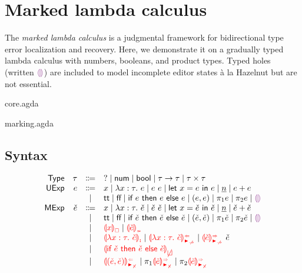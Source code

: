 \documentclass[formalism.tex]{subfiles}
\begin{document}




\section{Marked lambda calculus}
\label{sec:marked}

The \emph{marked lambda calculus} is a judgmental framework for bidirectional type error
localization and recovery. Here, we demonstrate it on a gradually typed lambda calculus with
numbers, booleans, and product types. Typed holes (written $\EEHole$) are included to model
incomplete editor states \`a la Hazelnut but are not essential.

\begin{mechanization}
  \item core.agda
  \item marking.agda
\end{mechanization}

\subsection{Syntax}
\label{sec:marked-syntax}
\[\begin{array}{rrcl}
  \TMName  & \TMV  & \Coloneqq & \TUnknown \mid \TNum \mid \TBool \mid \TArrow{\TMV}{\TMV} \mid \TProd{\TMV}{\TMV} \\
  \EMName  & \EMV  & \Coloneqq & x \mid \ELam{x}{\TMV}{\EMV} \mid \EAp{\EMV}{\EMV} \mid \ELet{x}{\EMV}{\EMV}
                     \mid           \ENumMV \mid \EPlus{\EMV}{\EMV} \\
           &       & \mid         & \ETrue \mid \EFalse \mid \EIf{\EMV}{\EMV}{\EMV}
                     \mid           \EPair{\EMV}{\EMV}
                     \mid           \EProjL{\EMV} \mid \EProjR{\EMV}
                     \mid           \EEHole \\
  \ECMName & \ECMV & \Coloneqq & x \mid \ECLam{x}{\TMV}{\ECMV} \mid \ECAp{\ECMV}{\ECMV} \mid \ECLet{x}{\ECMV}{\ECMV}
                     \mid           \ECNumMV \mid \ECPlus{\ECMV}{\ECMV} \\
           &       & \mid         & \ECTrue \mid \ECFalse \mid \ECIf{\ECMV}{\ECMV}{\ECMV}
                     \mid           \ECPair{\ECMV}{\ECMV} \mid \ECProjL{\ECMV} \mid \ECProjR{\ECMV}
                     \mid           \ECEHole \\
           &       & \mid         & \ECFree{x} \mid \ECInconType{\ECMV} \\
           &       & \mid         & \ECLamInconAsc{x}{\TMV}{\ECMV} \mid \ECLamAnaNonMatchedArrow{x}{\TMV}{\ECMV} \mid \ECApSynNonMatchedArrow{\ECMV}{\ECMV} \\
           &       & \mid         & \ECInconBr{\ECMV}{\ECMV}{\ECMV} \\
           &       & \mid         & \ECPairAnaNonMatchedProd{\ECMV}{\ECMV} \mid \ECProjLSynNonMatchedProd{\ECMV} \mid \ECProjRSynNonMatchedProd{\ECMV}
\end{array}\]
\end{document}
